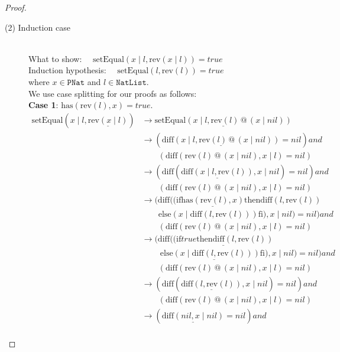 \documentclass[12pt, a4paper]{article}
\newcommand{\rel}[1]{\mathrel{#1}}
\newcommand{\rmx}[1]{\mathrm{#1}}
\newcommand{\larrow}{\longrightarrow}
\newcommand{\under}{\underline}
\begin{document}
\begin{proof}
\begin{description}
\item[(2) Induction case]~\\
What to show: $\quad \rmx{setEqual}(x \mid l, \rmx{rev}(x \mid l)) = true$\\
Induction hypothesis: $\quad \rmx{setEqual}(l, \rmx{rev}(l)) = true$  \\
where $x \in \mathtt{PNat}$ and $l \in \mathtt{NatList}$.\\
We use case splitting for our proofs as follows: \\
\textbf{Case 1}: $\rmx{has}(\rmx{rev}(l), x) = true$.
\begin{align*}
\rmx{setEqual}(x \mid l, \under{\rmx{rev}(x \mid l)})
	&\larrow \under{\rmx{setEqual}(x \mid l, \rmx{rev}(l) \rel{@} (x \mid nil))} \tag{by rev2} \\
	&\larrow (\under{\rmx{diff}(x \mid l, \rmx{rev}(l) \rel{@} (x \mid nil))} = nil) \rel{and} \\
	&\quad \quad (\rmx{diff}(\rmx{rev}(l) \rel{@} (x \mid nil), x \mid l) = nil) \tag{by setEq} \\
	&\larrow (\rmx{diff}(\under{\rmx{diff}(x \mid l, \rmx{rev}(l))}, x \mid nil) = nil) \rel{and} \\
	&\quad \quad (\rmx{diff}(\rmx{rev}(l) \rel{@} (x \mid nil), x \mid l) = nil) \tag{by Problem 7 - Lemma 1} \\
	&\larrow (\rmx{diff}((\rel{\rmx{if}} \under{\rmx{has}(\rmx{rev}(l), x)} \rel{\rmx{then}} \rmx{diff}(l, \rmx{rev}(l)) \\
	&\quad \quad \rel{\rmx{else}} (x \mid \rmx{diff}(l, \rmx{rev}(l))) \rel{\rmx{fi}}), x \mid nil) = nil) \rel{and} \\
	&\quad \quad (\rmx{diff}(\rmx{rev}(l) \rel{@} (x \mid nil), x \mid l) = nil) \tag{by diff2} \\
	 &\larrow (\rmx{diff}(\under{(\rel{\rmx{if}} true \rel{\rmx{then}} \rmx{diff}(l, \rmx{rev}(l))} \\
	&\quad \quad\ \under{\rel{\rmx{else}} (x \mid \rmx{diff}(l, \rmx{rev}(l))) \rel{\rmx{fi}})}, x \mid nil) = nil) \rel{and} \\
	&\quad \quad (\rmx{diff}(\rmx{rev}(l) \rel{@} (x \mid nil), x \mid l) = nil) \tag{by case splitting} \\
	 &\larrow (\rmx{diff}(\under{\rmx{diff}(l, \rmx{rev}(l))}, x \mid nil) = nil) \rel{and} \\
	&\quad \quad (\rmx{diff}(\rmx{rev}(l) \rel{@} (x \mid nil), x \mid l) = nil) \tag{by if1} \\
	 &\larrow (\under{\rmx{diff}(nil, x \mid nil)} = nil) \rel{and} \\

\end{align*}
\end{description}
\end{proof}
\end{document}
